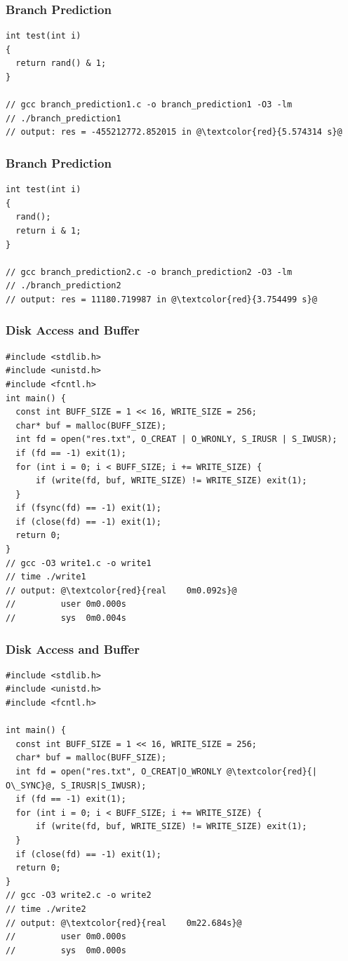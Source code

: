 \documentclass{beamer}
\begin{document}
\begin{frame}[fragile]
\frametitle{Branch Prediction}
\scriptsize
\begin{lstlisting}
int test(int i)
{
  return rand() & 1;
}

// gcc branch_prediction1.c -o branch_prediction1 -O3 -lm
// ./branch_prediction1
// output: res = -455212772.852015 in @\textcolor{red}{5.574314 s}@
\end{lstlisting}

\end{frame}

\begin{frame}[fragile]
\frametitle{Branch Prediction}
\scriptsize
\begin{lstlisting}
int test(int i)
{
  rand();
  return i & 1;
}

// gcc branch_prediction2.c -o branch_prediction2 -O3 -lm
// ./branch_prediction2
// output: res = 11180.719987 in @\textcolor{red}{3.754499 s}@
\end{lstlisting}

\end{frame}

\begin{frame}[fragile]
\frametitle{Disk Access and Buffer}
\scriptsize
\begin{lstlisting}[linebackgroundcolor={\lstcolorlines{7,10,12}}]
#include <stdlib.h>
#include <unistd.h>
#include <fcntl.h>
int main() {
  const int BUFF_SIZE = 1 << 16, WRITE_SIZE = 256;
  char* buf = malloc(BUFF_SIZE);
  int fd = open("res.txt", O_CREAT | O_WRONLY, S_IRUSR | S_IWUSR);
  if (fd == -1) exit(1);
  for (int i = 0; i < BUFF_SIZE; i += WRITE_SIZE) {
      if (write(fd, buf, WRITE_SIZE) != WRITE_SIZE) exit(1);
  }
  if (fsync(fd) == -1) exit(1);
  if (close(fd) == -1) exit(1);
  return 0;
}
// gcc -O3 write1.c -o write1
// time ./write1
// output: @\textcolor{red}{real	0m0.092s}@
//         user	0m0.000s
//         sys	0m0.004s
\end{lstlisting}

\end{frame}

\begin{frame}[fragile]
\frametitle{Disk Access and Buffer}
\scriptsize
\begin{lstlisting}[linebackgroundcolor={\lstcolorlines{8,11}}]
#include <stdlib.h>
#include <unistd.h>
#include <fcntl.h>

int main() {
  const int BUFF_SIZE = 1 << 16, WRITE_SIZE = 256;
  char* buf = malloc(BUFF_SIZE);
  int fd = open("res.txt", O_CREAT|O_WRONLY @\textcolor{red}{| O\_SYNC}@, S_IRUSR|S_IWUSR);
  if (fd == -1) exit(1);
  for (int i = 0; i < BUFF_SIZE; i += WRITE_SIZE) {
      if (write(fd, buf, WRITE_SIZE) != WRITE_SIZE) exit(1);
  }
  if (close(fd) == -1) exit(1);
  return 0;
}
// gcc -O3 write2.c -o write2
// time ./write2
// output: @\textcolor{red}{real	0m22.684s}@
//         user	0m0.000s
//         sys	0m0.000s
\end{lstlisting}

\end{frame}
\end{document}
